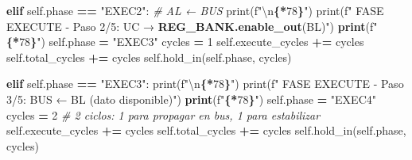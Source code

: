 \documentclass[12pt,oneside]{templates/unerthesis}
\newenvironment{Shaded}{\begin{snugshade}}{\end{snugshade}}
\newcommand{\BuiltInTok}[1]{#1}
\newcommand{\CharTok}[1]{\textcolor[rgb]{0.31,0.60,0.02}{#1}}
\newcommand{\CommentTok}[1]{\textcolor[rgb]{0.56,0.35,0.01}{\textit{#1}}}
\newcommand{\ControlFlowTok}[1]{\textcolor[rgb]{0.13,0.29,0.53}{\textbf{#1}}}
\newcommand{\DecValTok}[1]{\textcolor[rgb]{0.00,0.00,0.81}{#1}}
\newcommand{\ErrorTok}[1]{\textcolor[rgb]{0.64,0.00,0.00}{\textbf{#1}}}
\newcommand{\NormalTok}[1]{#1}
\newcommand{\OperatorTok}[1]{\textcolor[rgb]{0.81,0.36,0.00}{\textbf{#1}}}
\newcommand{\SpecialCharTok}[1]{\textcolor[rgb]{0.81,0.36,0.00}{\textbf{#1}}}
\newcommand{\SpecialStringTok}[1]{\textcolor[rgb]{0.31,0.60,0.02}{#1}}
\newcommand{\StringTok}[1]{\textcolor[rgb]{0.31,0.60,0.02}{#1}}
\newcommand{\VariableTok}[1]{\textcolor[rgb]{0.00,0.00,0.00}{#1}}
\begin{document}
\begin{Shaded}
\begin{Highlighting}[]
        \ControlFlowTok{elif} \VariableTok{self}\NormalTok{.phase }\OperatorTok{==} \StringTok{"EXEC2"}\NormalTok{:  }\CommentTok{\# AL ← BUS}
            \BuiltInTok{print}\NormalTok{(}\SpecialStringTok{f"}\CharTok{\textbackslash{}n}\SpecialCharTok{\{}\StringTok{\textquotesingle{}{-}\textquotesingle{}}\OperatorTok{*}\DecValTok{78}\SpecialCharTok{\}}\SpecialStringTok{"}\NormalTok{)}
            \BuiltInTok{print}\NormalTok{(}\SpecialStringTok{f"  FASE EXECUTE {-} Paso 2/5: UC → }
\ErrorTok{            REG\_BANK.enable\_out}\NormalTok{(BL)}\StringTok{")}
\ErrorTok{            print}\NormalTok{(}\SpecialStringTok{f"}\SpecialCharTok{\{}\StringTok{\textquotesingle{}{-}\textquotesingle{}}\OperatorTok{*}\DecValTok{78}\SpecialCharTok{\}}\SpecialStringTok{"}\NormalTok{)}
            \VariableTok{self}\NormalTok{.phase }\OperatorTok{=} \StringTok{"EXEC3"}
\NormalTok{            cycles }\OperatorTok{=} \DecValTok{1}
            \VariableTok{self}\NormalTok{.execute\_cycles }\OperatorTok{+=}\NormalTok{ cycles}
            \VariableTok{self}\NormalTok{.total\_cycles }\OperatorTok{+=}\NormalTok{ cycles}
            \VariableTok{self}\NormalTok{.hold\_in(}\VariableTok{self}\NormalTok{.phase, cycles)}
        
        \ControlFlowTok{elif} \VariableTok{self}\NormalTok{.phase }\OperatorTok{==} \StringTok{"EXEC3"}\NormalTok{:}
            \BuiltInTok{print}\NormalTok{(}\SpecialStringTok{f"}\CharTok{\textbackslash{}n}\SpecialCharTok{\{}\StringTok{\textquotesingle{}{-}\textquotesingle{}}\OperatorTok{*}\DecValTok{78}\SpecialCharTok{\}}\SpecialStringTok{"}\NormalTok{)}
            \BuiltInTok{print}\NormalTok{(}\SpecialStringTok{f"  FASE EXECUTE {-} Paso 3/5: BUS ← BL }
\ErrorTok{            }\NormalTok{(dato disponible)}\StringTok{")}
\ErrorTok{            print}\NormalTok{(}\SpecialStringTok{f"}\SpecialCharTok{\{}\StringTok{\textquotesingle{}{-}\textquotesingle{}}\OperatorTok{*}\DecValTok{78}\SpecialCharTok{\}}\SpecialStringTok{"}\NormalTok{)}
            \VariableTok{self}\NormalTok{.phase }\OperatorTok{=} \StringTok{"EXEC4"}
\NormalTok{            cycles }\OperatorTok{=} \DecValTok{2}  
            \CommentTok{\# 2 ciclos: 1 para propagar en bus, 1 para estabilizar}
            \VariableTok{self}\NormalTok{.execute\_cycles }\OperatorTok{+=}\NormalTok{ cycles}
            \VariableTok{self}\NormalTok{.total\_cycles }\OperatorTok{+=}\NormalTok{ cycles}
            \VariableTok{self}\NormalTok{.hold\_in(}\VariableTok{self}\NormalTok{.phase, cycles)}
        

\end{Highlighting}
\end{Shaded}
\end{document}
